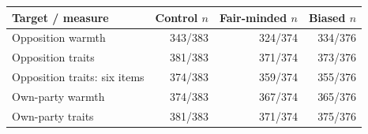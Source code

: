 \begin{tabular}{lrrr}
\toprule
Target / measure & Control $n$ & Fair-minded $n$ & Biased $n$ \\
\midrule
Opposition warmth & 343/383 & 324/374 & 334/376 \\
Opposition traits & 381/383 & 371/374 & 373/376 \\
Opposition traits: six items & 374/383 & 359/374 & 355/376 \\
Own-party warmth & 374/383 & 367/374 & 365/376 \\
Own-party traits & 381/383 & 371/374 & 375/376 \\
\bottomrule
\end{tabular}
